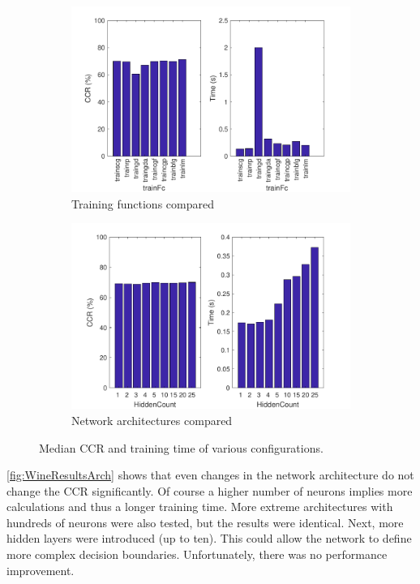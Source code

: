 \documentclass[a4, 10pt, twoside, twocolumn]{article}
\numberwithin{figure}{section}
\begin{document}
\begin{figure}[t]
    \begin{subfigure}{0.49\linewidth}
        \includegraphics[width=\linewidth]{img/WineResults.pdf}
        \caption{Training functions compared}
        \label{fig:WineResults}
    \end{subfigure}
    \begin{subfigure}{0.49\linewidth}
        \includegraphics[width=\linewidth]{img/WineResultsArch.pdf}
        \caption{Network architectures compared}
        \label{fig:WineResultsArch}
    \end{subfigure}
     \caption{Median CCR and training time of various configurations.}
\end{figure}

\autoref{fig:WineResultsArch} shows that even changes in the network architecture do not change the CCR significantly. Of course a higher number of neurons implies more calculations and thus a longer training time. More extreme architectures with hundreds of neurons were also tested, but the results were identical. Next, more hidden layers were introduced (up to ten). This could allow the network to define more complex decision boundaries. Unfortunately, there was no performance improvement.
\end{document}

